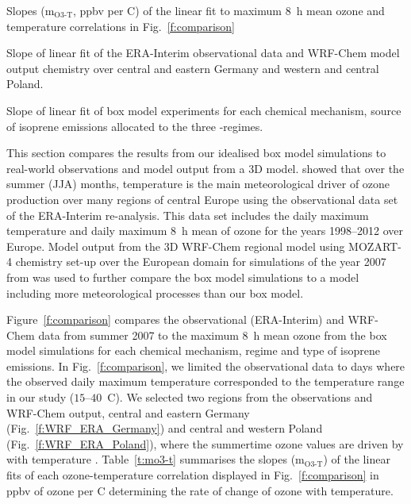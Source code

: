 \begin{table}[t]%
    \centering%
    \caption{Slopes (m$_{\text{O3-T}}$, ppbv per \degree C) of the linear fit to maximum 8~h mean ozone and temperature correlations in Fig.~\ref{f:comparison}}%
    \label{t:mo3-t}%
    \begin{subtable}[t]{\textwidth}%
        \centering%
        \vspace{2mm}%
        \caption{Slope of linear fit of the ERA-Interim observational data and WRF-Chem model output chemistry over central and eastern Germany and western and central Poland.}%
        \label{t:era_wrf_o3-T}%
    \end{subtable}
    \begin{subtable}[t]{\textwidth}%
        \centering%
        \vspace{2mm}
        \caption{Slope of linear fit of box model experiments for each chemical mechanism, source of isoprene emissions allocated to the three -regimes.}%
        \label{t:boxmodel_o3-T}%
    \end{subtable}
    \vspace{-4mm}
\end{table} 

This section compares the results from our idealised box model simulations to real-world observations and model output from a 3D model.
\citet{Otero:2016} showed that over the summer (JJA) months, temperature is the main meteorological driver of ozone production over many regions of central Europe using the observational data set of the ERA-Interim re-analysis.
This data set includes the daily maximum temperature and daily maximum 8~h mean of ozone for the years 1998--2012 over Europe.
Model output from the 3D WRF-Chem regional model using MOZART-4 chemistry set-up over the European domain for simulations of the year 2007 from \citet{Mar:2016} was used to further compare the box model simulations to a model including more meteorological processes than our box model.

Figure~\ref{f:comparison} compares the observational (ERA-Interim) and WRF-Chem data from summer 2007 to the maximum 8~h mean ozone from the box model simulations for each chemical mechanism,  regime and type of isoprene emissions.
In Fig.~\ref{f:comparison}, we limited the observational data to days where the observed daily maximum temperature corresponded to the temperature range in our study ($15$--$40$~\degree C).
We selected two regions from the observations and WRF-Chem output, central and eastern Germany (Fig.~\ref{f:WRF_ERA_Germany}) and central and western Poland (Fig.~\ref{f:WRF_ERA_Poland}), where the summertime ozone values are driven by with temperature \citep{Otero:2016}.
Table~\ref{t:mo3-t} summarises the slopes (m$_{\text{O3-T}}$) of the linear fits of each ozone-temperature correlation displayed in Fig.~\ref{f:comparison} in ppbv of ozone per \degree C determining the rate of change of ozone with temperature.

